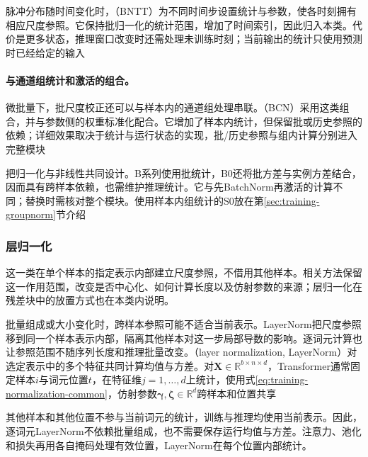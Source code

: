 脉冲分布随时间变化时，（BNTT）为不同时间步设置统计与参数，使各时刻拥有相应尺度参照。它保持批归一化的统计范围，增加了时间索引，因此归入本类。代价是更多状态，推理窗口改变时还需处理未训练时刻；当前输出的统计只使用预测时已经给定的输入

\paragraph{与通道组统计和激活的组合。}

微批量下，批尺度校正还可以与样本内的通道组处理串联。（BCN）采用这类组合，并与参数侧的权重标准化配合。它增加了样本内统计，但保留批或历史参照的依赖；详细效果取决于统计与运行状态的实现，批/历史参照与组内计算分别进入完整模块

把归一化与非线性共同设计。B系列使用批统计，B0还将批方差与实例方差结合，因而具有跨样本依赖，也需维护推理统计。它与先BatchNorm再激活的计算不同；替换时需核对整个模块。使用样本内组统计的S0放在第\ref{sec:training-groupnorm}节介绍

\subsubsection{层归一化}
\label{sec:training-layernorm-family}
\label{sec:training-layernorm}
\label{sec:training-rmsnorm}
\label{sec:training-scalenorm}
\label{sec:training-pixelnorm}
\label{sec:training-qknorm}
\label{sec:training-adaptive-layernorm}
\label{sec:training-normalization-block-designs}
\label{sec:training-normalization-placement}
\label{sec:training-other-normalization-designs}
这一类在单个样本的指定表示内部建立尺度参照，不借用其他样本。相关方法保留这一作用范围，改变是否中心化、如何计算长度以及仿射参数的来源；层归一化在残差块中的放置方式也在本类内说明。

批量组成或大小变化时，跨样本参照可能不适合当前表示。LayerNorm把尺度参照移到同一个样本表示内部，隔离其他样本对这一步局部导数的影响。逐词元计算也让参照范围不随序列长度和推理批量改变。（layer normalization, LayerNorm）对选定表示中的多个特征共同计算均值与方差。对$\bm X\in\mathbb R^{b\times n\times d}$，Transformer通常固定样本$i$与词元位置$t$，在特征维$j=1,\ldots,d$上统计，使用式\eqref{eq:training-normalization-common}，仿射参数$\bm\gamma,\bm\zeta\in\mathbb R^d$跨样本和位置共享

其他样本和其他位置不参与当前词元的统计，训练与推理均使用当前表示。因此，逐词元LayerNorm不依赖批量组成，也不需要保存运行均值与方差。注意力、池化和损失再用各自掩码处理有效位置，LayerNorm在每个位置内部统计。

